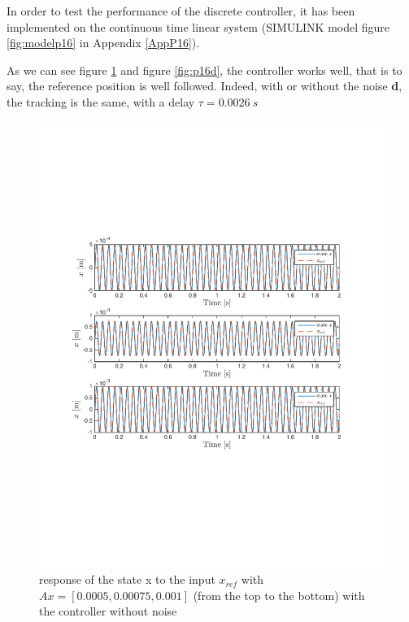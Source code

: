 In order to test the performance of the discrete controller, it has been implemented on the continuous time linear system (SIMULINK model figure \ref{fig:modelp16} in Appendix \ref{AppP16}).

As we can see figure \ref{fig:p16d0} and figure \ref{fig:p16d}, the controller works well, that is to say, the reference position is well followed. Indeed, with or without the noise \textbf{d}, the tracking is the same, with a delay $\tau = 0.0026\ s$

\begin{figure}[H]
 \centering 
 \includegraphics[trim=2cm 7cm 2cm 7cm, clip=true, totalheight=0.35\textheight, angle=0]{figures/p16d0.pdf}
 \caption{response of the state x to the input $x_{ref}$ with $Ax = [0.0005,0.00075, 0.001]$ (from the top to the bottom) with the controller without noise}
 \label{fig:p16d0}
\end{figure}

